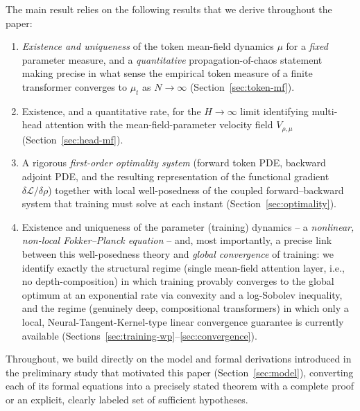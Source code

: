 \documentclass[11pt,a4wide]{article}
\theoremstyle{definition}
\begin{document}
The main result relies on the following results that we derive throughout the paper:
\begin{enumerate}
\item \emph{Existence and uniqueness} of the token mean-field dynamics $\mu$ for a \emph{fixed} parameter measure, and a \emph{quantitative} propagation-of-chaos statement making precise in what sense the empirical token measure of a finite transformer converges to $\mu_t$ as $N\to\infty$ (Section~\ref{sec:token-mf}).
\item Existence, and a quantitative rate, for the $H\to\infty$ limit identifying multi-head attention with the mean-field-parameter velocity field $V_{\rho,\mu}$ (Section~\ref{sec:head-mf}).
\item A rigorous \emph{first-order optimality system} (forward token PDE, backward adjoint PDE, and the resulting representation of the functional gradient $\delta \mathcal L/\delta\rho$) together with local well-posedness of the coupled forward--backward system that training must solve at each instant (Section~\ref{sec:optimality}).
\item Existence and uniqueness of the parameter (training) dynamics -- a \emph{nonlinear, non-local Fokker--Planck equation} -- and, most importantly, a precise link between this well-posedness theory and \emph{global convergence} of training: we identify exactly the structural regime (single mean-field attention layer, i.e., no depth-composition) in which training provably converges to the global optimum at an exponential rate via convexity and a log-Sobolev inequality, and the regime (genuinely deep, compositional transformers) in which only a local, Neural-Tangent-Kernel-type linear convergence guarantee is currently available (Sections~\ref{sec:training-wp}--\ref{sec:convergence}).
\end{enumerate}
Throughout, we build directly on the model and formal derivations introduced in the preliminary study that motivated this paper (Section~\ref{sec:model}), converting each of its formal equations into a precisely stated theorem with a complete proof or an explicit, clearly labeled set of sufficient hypotheses. 
\end{document}
